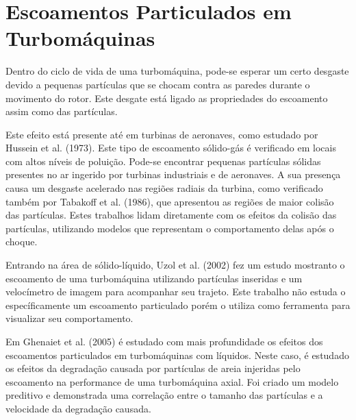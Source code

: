 \section{\textbf{Escoamentos Particulados em Turbomáquinas}}
\label{sec_rev_EP}
Dentro do ciclo de vida de uma turbomáquina, pode-se esperar um certo desgaste devido a pequenas partículas que se chocam contra as paredes durante o movimento do rotor.
Este desgate está ligado as propriedades do escoamento assim como das partículas.

Este efeito está presente até em turbinas de aeronaves, como estudado por Hussein et al. (1973)\cite{Hussein-1973}.
Este tipo de escoamento sólido-gás é verificado em locais com altos níveis de poluição.
Pode-se encontrar pequenas partículas sólidas presentes no ar ingerido por turbinas industriais e de aeronaves.
A sua presença causa um desgaste acelerado nas regiões radiais da turbina, como verificado também por Tabakoff et al. (1986)\cite{Tabakoff-1986}, que apresentou as regiões de maior colisão das partículas.
Estes trabalhos lidam diretamente com os efeitos da colisão das partículas, utilizando modelos que representam o comportamento delas após o choque.

Entrando na área de sólido-líquido, Uzol et al. (2002)\cite{Uzol-2002} fez um estudo mostranto o escoamento de uma turbomáquina utilizando partículas inseridas e um velocímetro de imagem para acompanhar seu trajeto.
Este trabalho não estuda o específicamente um escoamento particulado porém o utiliza como ferramenta para visualizar seu comportamento.

Em Ghenaiet et al. (2005)\cite{Ghenaiet-2005} é estudado com mais profundidade os efeitos dos escoamentos particulados em turbomáquinas com líquidos.
Neste caso, é estudado os efeitos da degradação causada por partículas de areia injeridas pelo escoamento na performance de uma turbomáquina axial.
Foi criado um modelo preditivo e demonstrada uma correlação entre o tamanho das partículas e a velocidade da degradação causada.

